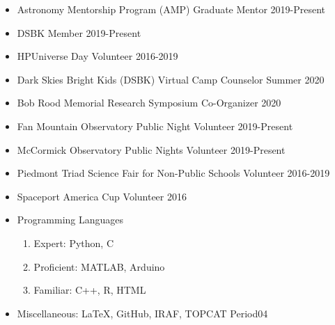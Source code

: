 \documentclass[letterpaper,12pt]{article}
\begin{document}
\vspace{-2mm}
\begin{itemize}
    \item Astronomy Mentorship Program (AMP) Graduate Mentor \hfill 2019-Present\vspace{-3mm}
    \item DSBK Member \hfill 2019-Present\vspace{-3mm}
    \item HPUniverse Day Volunteer \hfill 2016-2019\vspace{-3mm}
    \item Dark Skies Bright Kids (DSBK) Virtual Camp Counselor \hfill Summer 2020\vspace{-3mm}
    \item Bob Rood Memorial Research Symposium Co-Organizer \hfill 2020\vspace{-3mm}
    \item Fan Mountain Observatory Public Night Volunteer \hfill 2019-Present\vspace{-3mm}
    \item McCormick Observatory Public Nights Volunteer \hfill 2019-Present\vspace{-3mm}
    \item Piedmont Triad Science Fair for Non-Public Schools Volunteer \hfill 2016-2019 \vspace{-3mm}
    \item Spaceport America Cup Volunteer \hfill 2016 \vspace{-1mm}
\end{itemize}

\vspace{3mm}
\noindent{}

\vspace{-2mm}
\begin{itemize}
    \item Programming Languages
    \begin{enumerate}\vspace{-3mm}
        \item Expert: Python, C \vspace{-1mm}
        \item Proficient: MATLAB, Arduino \vspace{-1mm}
        \item Familiar:  C++, R, HTML
    \end{enumerate}\vspace{-4mm}
    \item Miscellaneous: \LaTeX, GitHub, IRAF, TOPCAT Period04\vspace{-2mm}
    
\end{itemize}
\end{document}
